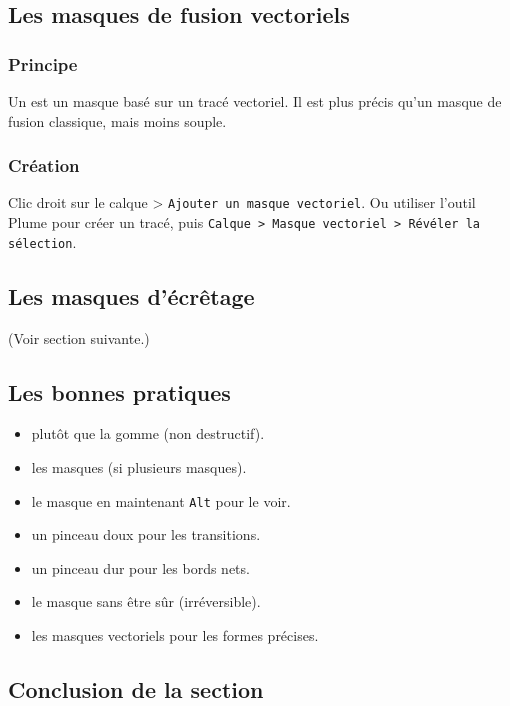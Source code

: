 \subsection{Les masques de fusion vectoriels}

\subsubsection{Principe}

Un  est un masque basé sur un tracé vectoriel. Il est plus précis qu'un masque de fusion classique, mais moins souple.

\subsubsection{Création}

Clic droit sur le calque > \texttt{Ajouter un masque vectoriel}. Ou utiliser l'outil Plume pour créer un tracé, puis \texttt{Calque > Masque vectoriel > Révéler la sélection}.

\subsection{Les masques d'écrêtage}

(Voir section suivante.)

\subsection{Les bonnes pratiques}

\begin{itemize}
    \item {} plutôt que la gomme (non destructif).
    \item {} les masques (si plusieurs masques).
    \item {} le masque en maintenant \texttt{Alt} pour le voir.
    \item {} un pinceau doux pour les transitions.
    \item {} un pinceau dur pour les bords nets.
    \item {} le masque sans être sûr (irréversible).
    \item {} les masques vectoriels pour les formes précises.
\end{itemize}

\subsection*{Conclusion de la section}

